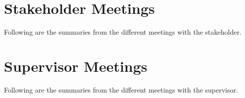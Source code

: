 \documentclass[BSP,english,oneside]{ntnuthesis/ntnubachelorthesis}
\begin{document}
\chapter{Stakeholder Meetings}
\label{chap:appendix_stakeholder_meetings}
Following are the summaries from the different meetings with the stakeholder.





\chapter{Supervisor Meetings}
\label{chap:appendix_supervisor_meetings}
Following are the summaries from the different meetings with the supervisor.




\end{document}
